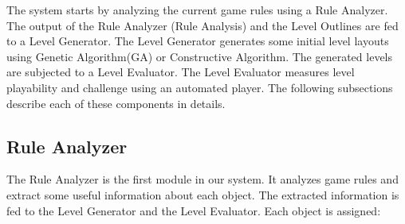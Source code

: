 \documentclass[letterpaper]{article}
\begin{document}
The system starts by analyzing the current game rules using a Rule Analyzer. The output of the Rule Analyzer (Rule Analysis) and the Level Outlines are fed to a Level Generator. The Level Generator generates some initial level layouts using Genetic Algorithm(GA) or Constructive Algorithm. The generated levels are subjected to a Level Evaluator. The Level Evaluator measures level playability and challenge using an automated player. The following subsections describe each of these components in details.\\\par

\subsection{Rule Analyzer}
The Rule Analyzer is the first module in our system. It analyzes game rules and extract some useful information about each object. The extracted information is fed to the Level Generator and the Level Evaluator. Each object is assigned:
\end{document}
